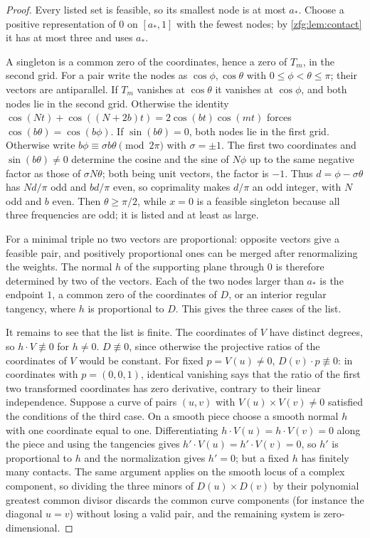 \begin{proof}
Every listed set is feasible, so its smallest node is at most $a_*$. Choose a positive representation of $0$ on
$[a_*,1]$ with the fewest nodes; by \cref{zfg:lem:contact} it has at most three and uses $a_*$.

A singleton is a common zero of the coordinates, hence a zero of $T_m$, in the second grid. For a pair write the
nodes as $\cos\phi,\cos\theta$ with $0\le\phi<\theta\le\pi$; their vectors are antiparallel. If $T_m$ vanishes at
$\cos\theta$ it vanishes at $\cos\phi$, and both nodes lie in the second grid. Otherwise the identity
$\cos(Nt)+\cos((N+2b)t)=2\cos(bt)\cos(mt)$ forces $\cos(b\theta)=\cos(b\phi)$. If $\sin(b\theta)=0$, both nodes lie in the
first grid. Otherwise write $b\phi\equiv\sigma b\theta\pmod{2\pi}$ with $\sigma=\pm1$. The first two coordinates and
$\sin(b\theta)\ne0$ determine the cosine and the sine of $N\phi$ up to the same negative factor as those of $\sigma N\theta$;
both being unit vectors, the factor is $-1$. Thus $d=\phi-\sigma\theta$ has $Nd/\pi$ odd and $bd/\pi$ even, so coprimality makes
$d/\pi$ an odd integer, with $N$ odd and $b$ even. Then $\theta\ge\pi/2$, while $x=0$ is a feasible singleton because all
three frequencies are odd; it is listed and at least as large.

For a minimal triple no two vectors are proportional: opposite vectors give a feasible pair, and positively
proportional ones can be merged after renormalizing the weights. The normal $h$ of the supporting plane through
$0$ is therefore determined by two of the vectors. Each of the two nodes larger than $a_*$ is the endpoint $1$, a
common zero of the coordinates of $D$, or an interior regular tangency, where $h$ is proportional to $D$. This
gives the three cases of the list.

It remains to see that the list is finite. The coordinates of $V$ have distinct degrees, so $h\cdot V\not\equiv0$ for
$h\ne0$. $D\not\equiv0$, since otherwise the projective ratios of the coordinates of $V$ would be constant. For fixed
$p=V(u)\ne0$, $D(v)\cdot p\not\equiv0$: in coordinates with $p=(0,0,1)$, identical vanishing says that the ratio of the
first two transformed coordinates has zero derivative, contrary to their linear independence. Suppose a curve of
pairs $(u,v)$ with $V(u)\times V(v)\ne0$ satisfied the conditions of the third case. On a smooth piece choose a
smooth normal $h$ with one coordinate equal to one. Differentiating $h\cdot V(u)=h\cdot V(v)=0$ along the piece and
using the tangencies gives $h'\cdot V(u)=h'\cdot V(v)=0$, so $h'$ is proportional to $h$ and the normalization gives
$h'=0$; but a fixed $h$ has finitely many contacts. The same argument applies on the smooth locus of a complex
component, so dividing the three minors of $D(u)\times D(v)$ by their polynomial greatest common divisor discards the
common curve components (for instance the diagonal $u=v$) without losing a valid pair, and the remaining system is
zero-dimensional.
\end{proof}

